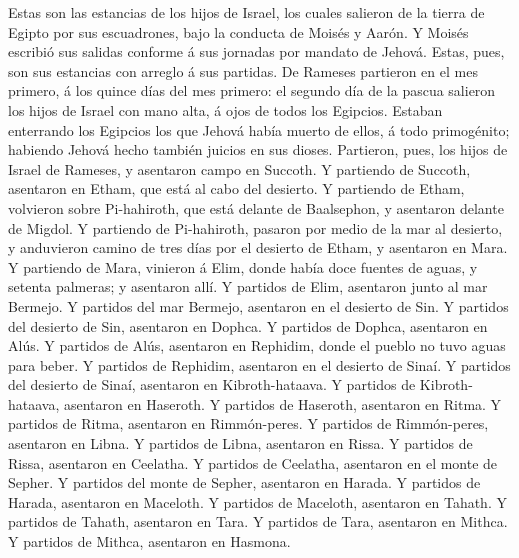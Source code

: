  Estas son las estancias de los hijos de Israel, los
cuales salieron de la tierra de Egipto por sus escuadrones, bajo la
conducta de Moisés y Aarón.  Y Moisés escribió sus salidas
conforme á sus jornadas por mandato de Jehová. Estas, pues, son sus
estancias con arreglo á sus partidas.  De Rameses
partieron en el mes primero, á los quince días del mes primero: el
segundo día de la pascua salieron los hijos de Israel con mano alta, á
ojos de todos los Egipcios.  Estaban enterrando los
Egipcios los que Jehová había muerto de ellos, á todo primogénito;
habiendo Jehová hecho también juicios en sus dioses. 
Partieron, pues, los hijos de Israel de Rameses, y asentaron campo en
Succoth.  Y partiendo de Succoth, asentaron en Etham, que
está al cabo del desierto.  Y partiendo de Etham,
volvieron sobre Pi-hahiroth, que está delante de Baalsephon, y asentaron
delante de Migdol.  Y partiendo de Pi-hahiroth, pasaron
por medio de la mar al desierto, y anduvieron camino de tres días por el
desierto de Etham, y asentaron en Mara.  Y partiendo de
Mara, vinieron á Elim, donde había doce fuentes de aguas, y setenta
palmeras; y asentaron allí.  Y partidos de Elim,
asentaron junto al mar Bermejo.  Y partidos del mar
Bermejo, asentaron en el desierto de Sin.  Y partidos del
desierto de Sin, asentaron en Dophca.  Y partidos de
Dophca, asentaron en Alús.  Y partidos de Alús, asentaron
en Rephidim, donde el pueblo no tuvo aguas para beber.  Y
partidos de Rephidim, asentaron en el desierto de Sinaí. 
Y partidos del desierto de Sinaí, asentaron en Kibroth-hataava.
 Y partidos de Kibroth-hataava, asentaron en Haseroth.
 Y partidos de Haseroth, asentaron en Ritma.
 Y partidos de Ritma, asentaron en Rimmón-peres.
 Y partidos de Rimmón-peres, asentaron en Libna.
 Y partidos de Libna, asentaron en Rissa. 
Y partidos de Rissa, asentaron en Ceelatha.  Y partidos
de Ceelatha, asentaron en el monte de Sepher.  Y partidos
del monte de Sepher, asentaron en Harada.  Y partidos de
Harada, asentaron en Maceloth.  Y partidos de Maceloth,
asentaron en Tahath.  Y partidos de Tahath, asentaron en
Tara.  Y partidos de Tara, asentaron en Mithca.
 Y partidos de Mithca, asentaron en Hasmona.

